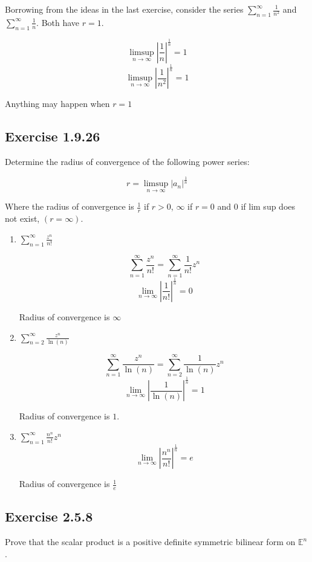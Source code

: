\documentclass{tufte-book}
\theoremstyle{mytheoremstyle}
\theoremstyle{mylemstyle}
\theoremstyle{mydefstyle}
\begin{document}
Borrowing from the ideas in the last exercise, consider the series $\sum_{n=1}^{\infty} \frac{1}{n^2}$ and $\sum_{n=1}^{\infty} \frac{1}{n}$.  Both have $r = 1$.

\[\limsup_{n \to \infty}|\frac{1}{n}|^{\frac{1}{n}} = 1 \]
\[\limsup_{n \to \infty}|\frac{1}{n^2}|^{\frac{1}{n}} =1 \] 

Anything may happen when $r = 1$

\subsection{Exercise 1.9.26}
Determine the radius of convergence of the following power series:

\[ r = \limsup_{n \to \infty}|a_n|^{\frac{1}{n}} \]

Where the radius of convergence is $\frac{1}{r}$ if $r > 0$, $\infty$ if $r = 0$ and $0$ if lim sup does not exist, $(r = \infty)$.

\begin{enumerate}

\item $\sum_{n=1}^{\infty}\frac{z^n}{n!}$

\[ \sum_{n=1}^{\infty}\frac{z^n}{n!} = \sum_{n=1}^{\infty}\frac{1}{n!}z^n \]
\[ \lim_{n \to \infty}|\frac{1}{n!}|^{\frac{1}{n}} = 0 \]

Radius of convergence is $\infty$

\item $\sum_{n=2}^{\infty}\frac{z^n}{\ln(n)}$

\[ \sum_{n=1}^{\infty}\frac{z^n}{\ln(n)} = \sum_{n=2}^{\infty}\frac{1}{\ln(n)}z^n \]
\[ \lim_{n \to \infty}|\frac{1}{\ln(n)}|^{\frac{1}{n}} = 1 \]

Radius of convergence is $1$.

\item $\sum_{n=1}^{\infty}\frac{n^n}{n!}z^n$
\[ \lim_{n \to \infty}|\frac{n^n}{n!}|^{\frac{1}{n}} = e \]

Radius of convergence is $\frac{1}{e}$
\end{enumerate}

\subsection{Exercise 2.5.8}
Prove that the scalar product is a positive definite symmetric bilinear form on $\mathbb{E}^n$.
\end{document}
